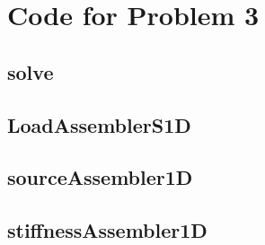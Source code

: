 \documentclass[11pt]{article}
\begin{document}
\section{Code for Problem 3}
\subsection{solve}\label{code:solve}

\subsection{LoadAssemblerS1D}\label{code:LoadAssemblerS1D}

\subsection{sourceAssembler1D}\label{code:sourceAssembler1D}

\subsection{stiffnessAssembler1D}\label{code:stiffnessAssembler1D}
\end{document}
